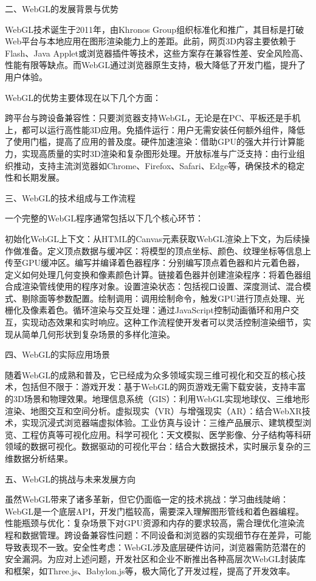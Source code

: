 二、WebGL的发展背景与优势

WebGL技术诞生于2011年，由Khronos Group组织标准化和推广，其目标是打破Web平台与本地应用在图形渲染能力上的差距。此前，网页3D内容主要依赖于Flash、Java Applet或浏览器插件等技术，这些方案存在兼容性差、安全风险高、性能有限等缺点。而WebGL通过浏览器原生支持，极大降低了开发门槛，提升了用户体验。

WebGL的优势主要体现在以下几个方面：

跨平台与跨设备兼容性：只要浏览器支持WebGL，无论是在PC、平板还是手机上，都可以运行高性能3D应用。免插件运行：用户无需安装任何额外组件，降低了使用门槛，提高了应用的普及度。硬件加速渲染：借助GPU的强大并行计算能力，实现高质量的实时3D渲染和复杂图形处理。开放标准与广泛支持：由行业组织推动，支持主流浏览器如Chrome、Firefox、Safari、Edge等，确保技术的稳定性和长期发展。

三、WebGL的技术组成与工作流程

一个完整的WebGL程序通常包括以下几个核心环节：

初始化WebGL上下文：从HTML的Canvas元素获取WebGL渲染上下文，为后续操作做准备。定义顶点数据与缓冲区：将模型的顶点坐标、颜色、纹理坐标等信息上传至GPU缓冲区。编写并编译着色器程序：分别编写顶点着色器和片元着色器，定义如何处理几何变换和像素颜色计算。链接着色器并创建渲染程序：将着色器组合成渲染管线使用的程序对象。设置渲染状态：包括视口设置、深度测试、混合模式、剔除面等参数配置。绘制调用：调用绘制命令，触发GPU进行顶点处理、光栅化及像素着色。循环渲染与交互处理：通过JavaScript控制动画循环和用户交互，实现动态效果和实时响应。这种工作流程使开发者可以灵活控制渲染细节，实现从简单几何形状到复杂场景的多样化渲染。

四、WebGL的实际应用场景

随着WebGL的成熟和普及，它已经成为众多领域实现三维可视化和交互的核心技术，包括但不限于：游戏开发：基于WebGL的网页游戏无需下载安装，支持丰富的3D场景和物理效果。地理信息系统（GIS）：利用WebGL实现地球仪、三维地形渲染、地图交互和空间分析。虚拟现实（VR）与增强现实（AR）：结合WebXR技术，实现沉浸式浏览器端虚拟体验。工业仿真与设计：三维产品展示、建筑模型浏览、工程仿真等可视化应用。科学可视化：天文模拟、医学影像、分子结构等科研领域的数据可视化。数据驱动的可视化平台：结合大数据技术，实时展示复杂的三维数据分析结果。

五、WebGL的挑战与未来发展方向

虽然WebGL带来了诸多革新，但它仍面临一定的技术挑战：学习曲线陡峭：WebGL是一个底层API，开发门槛较高，需要深入理解图形管线和着色器编程。性能瓶颈与优化：复杂场景下对GPU资源和内存的要求较高，需合理优化渲染流程和数据管理。跨设备兼容性问题：不同设备和浏览器的实现细节存在差异，可能导致表现不一致。安全性考虑：WebGL涉及底层硬件访问，浏览器需防范潜在的安全漏洞。为应对上述问题，开发社区和企业不断推出各种高层次WebGL封装库和框架，如Three.js、Babylon.js等，极大简化了开发过程，提高了开发效率。


